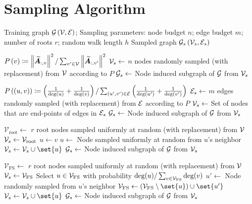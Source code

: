 \section{Sampling Algorithm}
\label{sec: sampler algo}

\begin{algorithm}
\caption{Graph sampling algorithms by {\graphsaint}}
\label{algo: gsaint sampler}
\begin{algorithmic}[1]
\renewcommand{\algorithmicrequire}{\textbf{Input:}}
\renewcommand{\algorithmicensure}{\textbf{Output:}}
\Require Training graph $\G\paren{\V,\E}$; Sampling parameters: node budget $n$; edge budget $m$; number of roots $r$; random walk length $h$
\Ensure Sampled graph $\G[s]\paren{\V[s],\E[s]}$

\State $P\paren{v}\coloneqq \norm{\Anorm_{:,v}}^2/\sum_{v'\in\V}\norm{\Anorm_{:,v'}}^2$
\State $\V[s]\gets $ $n$ nodes randomly sampled (with replacement) from $\V$ according to $P$
\State $\G[s]\gets $ Node induced subgraph of $\G$ from $\V[s]$
\EndFunction

\State $P\paren{\paren{u,v}}\coloneqq \paren{\frac{1}{\text{deg}\paren{u}}+\frac{1}{\text{deg}\paren{v}}}/\sum_{\paren{u',v'}\in\E}\paren{\frac{1}{\text{deg}\paren{u'}}+\frac{1}{\text{deg}\paren{v'}}}$
\State $\E[s]\gets $ $m$ edges randomly sampled (with replacement) from $\E$ according to $P$
\State $\V[s]\gets$ Set of nodes that are end-points of edges in $\E[s]$
\State $\G[s]\gets$ Node induced subgraph of $\G$ from $\V[s]$
\EndFunction

\State $\mathcal{V}_\text{root}\gets$ $r$ root nodes sampled uniformly at random (with replacement) from $\V$
\State $\V[s]\gets \mathcal{V}_\text{root}$
    \State $u\gets v$
        \State $u\gets $ Node sampled uniformly at random from $u$'s neighbor
        \State $\V[s]\gets \V[s]\cup\set{u}$
    \EndFor
\EndFor
\State $\G[s]\gets$ Node induced subgraph of $\G$ from $\V[s]$
\EndFunction

\State $\mathcal{V}_\text{FS}\gets$ $r$ root nodes sampled uniformly at random (with replacement) from $\V$
\State $\V[s]\gets \mathcal{V}_\text{FS}$
    \State Select $u\in \V_\text{FS}$ with probability $\text{deg}(u)/\sum_{v\in \V_\text{FS}}\text{deg}(v)$
    \State $u'\gets $ Node randomly sampled from $u$'s neighbor 
    \State $\mathcal{V}_\text{FS}\gets \paren{\mathcal{V}_\text{FS}\setminus \set{u}}\cup \set{u'}$
    \State $\V[s] \gets \V[s] \cup \set{u}$
\EndFor
\State $\G[s]\gets$ Node induced subgraph of $\G$ from $\V[s]$
\EndFunction
\end{algorithmic} 
\end{algorithm}

